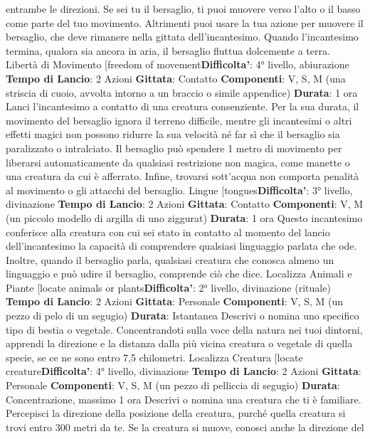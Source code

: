 \begin{multicols}{2}
entrambe le direzioni. Se sei tu il bersaglio, ti puoi
muovere verso l’alto o il basso come parte del tuo
movimento. Altrimenti puoi usare la tua azione per
muovere il bersaglio, che deve rimanere nella gittata
dell’incantesimo.
Quando l’incantesimo termina, qualora sia ancora in
aria, il bersaglio fluttua dolcemente a terra.
Libertà di Movimento
[freedom of movement\textbf{Difficolta'}:
4° livello, abiurazione
\textbf{Tempo di Lancio}: 2 Azioni
\textbf{Gittata}: Contatto
\textbf{Componenti}: V, S, M (una striscia di cuoio, avvolta
intorno a un braccio o simile appendice)
\textbf{Durata}: 1 ora
Lanci l’incantesimo a contatto di una creatura
consenziente. Per la sua durata, il movimento del
bersaglio ignora il terreno difficile, mentre gli
incantesimi o altri effetti magici non possono ridurre la
sua velocità né far sì che il bersaglio sia paralizzato o
intralciato.
Il bersaglio può spendere 1 metro di movimento per
liberarsi automaticamente da qualsiasi restrizione non
magica, come manette o una creatura da cui è
afferrato. Infine, trovarsi sott’acqua non comporta
penalità al movimento o gli attacchi del bersaglio.
Lingue
[tongues\textbf{Difficolta'}:
3° livello, divinazione
\textbf{Tempo di Lancio}: 2 Azioni
\textbf{Gittata}: Contatto
\textbf{Componenti}: V, M (un piccolo modello di argilla di uno
ziggurat)
\textbf{Durata}: 1 ora
Questo incantesimo conferisce alla creatura con cui sei
stato in contatto al momento del lancio dell’incantesimo
la capacità di comprendere qualsiasi linguaggio parlata
che ode. Inoltre, quando il bersaglio parla, qualsiasi
creatura che conosca almeno un linguaggio e può udire
il bersaglio, comprende ciò che dice.
Localizza Animali e Piante
[locate animals or plants\textbf{Difficolta'}:
2° livello, divinazione (rituale)
\textbf{Tempo di Lancio}: 2 Azioni
\textbf{Gittata}: Personale
\textbf{Componenti}: V, S, M (un pezzo di pelo di un segugio)
\textbf{Durata}: Istantanea
Descrivi o nomina uno specifico tipo di bestia o
vegetale. Concentrandoti sulla voce della natura nei
tuoi dintorni, apprendi la direzione e la distanza dalla
più vicina creatura o vegetale di quella specie, se ce ne
sono entro 7,5 chilometri.
Localizza Creatura
[locate creature\textbf{Difficolta'}:
4° livello, divinazione
\textbf{Tempo di Lancio}: 2 Azioni
\textbf{Gittata}: Personale
\textbf{Componenti}: V, S, M (un pezzo di pelliccia di segugio)
\textbf{Durata}: Concentrazione, massimo 1 ora
Descrivi o nomina una creatura che ti è familiare.
Percepisci la direzione della posizione della creatura,
purché quella creatura si trovi entro 300 metri da te. Se
la creatura si muove, conosci anche la direzione del

\end{multicols}
